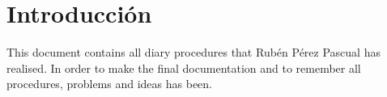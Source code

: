\section{Introducción}
\label{sec:intro}

This document contains all diary procedures that Rubén Pérez Pascual has realised.
In order to make the final documentation and to remember all procedures, problems and ideas has been.
